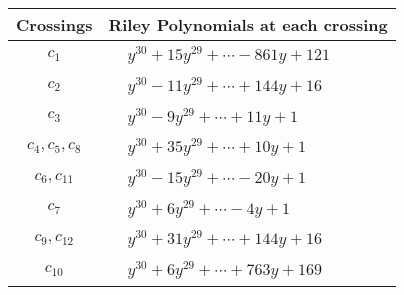 \documentclass[1p]{elsarticle_modified}
\theoremstyle{definition}
\begin{document}
\begin{tabular}{m{50pt}|m{274pt}}
Crossings & \hspace{64pt}Riley Polynomials at each crossing \\
\hline $$\begin{aligned}c_{1}\end{aligned}$$&$\begin{aligned}
&y^{30}+15 y^{29}+\cdots-861 y+121
\end{aligned}$\\
\hline $$\begin{aligned}c_{2}\end{aligned}$$&$\begin{aligned}
&y^{30}-11 y^{29}+\cdots+144 y+16
\end{aligned}$\\
\hline $$\begin{aligned}c_{3}\end{aligned}$$&$\begin{aligned}
&y^{30}-9 y^{29}+\cdots+11 y+1
\end{aligned}$\\
\hline $$\begin{aligned}c_{4},c_{5},c_{8}\end{aligned}$$&$\begin{aligned}
&y^{30}+35 y^{29}+\cdots+10 y+1
\end{aligned}$\\
\hline $$\begin{aligned}c_{6},c_{11}\end{aligned}$$&$\begin{aligned}
&y^{30}-15 y^{29}+\cdots-20 y+1
\end{aligned}$\\
\hline $$\begin{aligned}c_{7}\end{aligned}$$&$\begin{aligned}
&y^{30}+6 y^{29}+\cdots-4 y+1
\end{aligned}$\\
\hline $$\begin{aligned}c_{9},c_{12}\end{aligned}$$&$\begin{aligned}
&y^{30}+31 y^{29}+\cdots+144 y+16
\end{aligned}$\\
\hline $$\begin{aligned}c_{10}\end{aligned}$$&$\begin{aligned}
&y^{30}+6 y^{29}+\cdots+763 y+169
\end{aligned}$\\
\hline
\end{tabular}\\~\\
\end{document}
